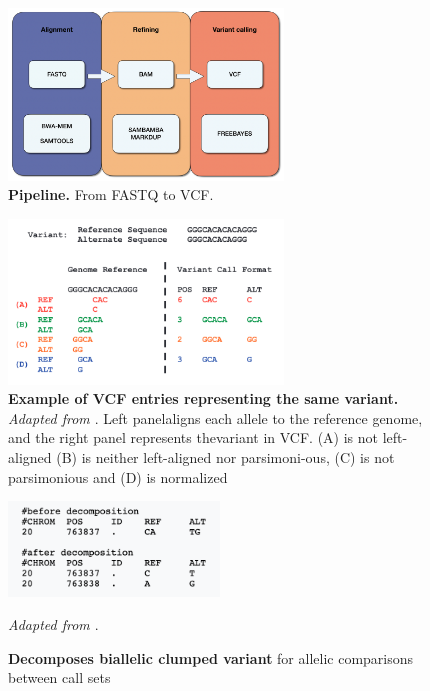 \documentclass[
tikz,
11pt, %
oneside, %
english, %
singlespacing, %
headsepline, %
]{MastersDoctoralThesisV2} %
\begin{document}
\begin{figure}[H]
\centering
\includegraphics[width=0.65\textwidth]{fig/align-ref-vc.png}
\decoRule
\caption{\textbf{Pipeline.} From FASTQ to VCF.} 
\label{fig:align-ref-vc}
\end{figure}

\begin{figure}[H]
\centering
\includegraphics[width=0.65\textwidth]{fig/vtNormalizeTan.png}
\decoRule
\caption{\textbf{Example  of  VCF  entries  representing  the  same  variant.} \textit{ Adapted from \cite{tan2015unified}}. Left  panelaligns each allele to the reference genome, and the right panel represents thevariant in VCF. (A) is not left-aligned (B) is neither left-aligned nor parsimoni-ous, (C) is not parsimonious and (D) is normalized}
\label{fig:vtNorm}
\end{figure}

\begin{figure}[H]
\centering
\includegraphics[width=0.5\textwidth]{fig/vtDecompose.png}
\decoRule
\caption{\textbf{Decomposes biallelic clumped variant} for allelic comparisons between call sets} \textit{ Adapted from \cite{tan2015unified}}. 
\label{fig:vtDecomp}
\end{figure}
\end{document}
